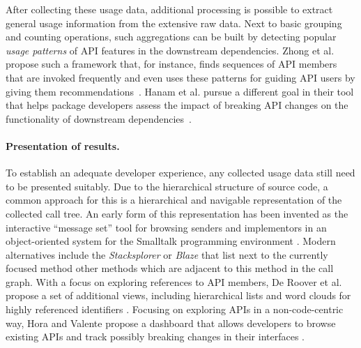 \documentclass[a4paper,twoside]{article}
\begin{document}
After collecting these usage data, additional processing is possible to extract general usage information from the extensive raw data.
Next to basic grouping and counting operations, such aggregations can be built by detecting popular \emph{usage patterns} of API features in the downstream dependencies.
Zhong et al. propose such a framework that, for instance, finds sequences of API members that are invoked frequently and even uses these patterns for guiding API users by giving them recommendations~\cite{zhong2009mapo}.
Hanam et al. pursue a different goal in their tool that helps package developers assess the impact of breaking API changes on the functionality of downstream dependencies~\cite{hanam2019aiding}.

\paragraph{Presentation of results.}
\label{sec:related_work/presentation}

To establish an adequate developer experience, any collected usage data still need to be presented suitably.
Due to the hierarchical structure of source code, a common approach for this is a hierarchical and navigable representation of the collected call tree.
An early form of this representation has been invented as the interactive \enquote{message set} tool for browsing senders and implementors in an object-oriented system for the Smalltalk programming environment \cite{goldberg1984smalltalk}.
Modern alternatives include the \emph{Stacksplorer} \cite{karrer2011stacksplorer} or \emph{Blaze} \cite{kramer2012blaze} that list next to the currently focused method other methods which are adjacent to this method in the call graph.
With a focus on exploring references to API members, De Roover et al. propose a set of additional views, including hierarchical lists and word clouds for highly referenced identifiers \cite{de2013multi}.
Focusing on exploring APIs in a non-code-centric way, Hora and Valente propose a dashboard that allows developers to browse existing APIs and track possibly breaking changes in their interfaces \cite{hora2015apiwave}.
\end{document}
